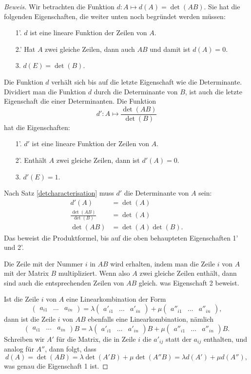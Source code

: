 \begin{proof}[Beweis]
Wir betrachten die Funktion $d\colon A\mapsto d(A) = \det(AB)$.
Sie hat die folgenden Eigenschaften, die weiter unten noch
begründet werden müssen:
\begin{enumerate}
\item[1'.] $d$ ist eine lineare Funktion der Zeilen von $A$.
\item[2.']
Hat $A$ zwei gleiche Zeilen, dann auch $AB$ und damit ist $d(A)=0$.
\item[3.]
$d(E)=\det(B)$.
\end{enumerate}
Die Funktion $d$ verhält sich bis auf die letzte Eigenschaft
wie die Determinante.
Dividiert man die Funktion $d$ durch die Determinante
von $B$, ist auch die letzte Eigenschaft die einer Determinanten.
Die Funktion
\[
d':A\mapsto \frac{\det(AB)}{\det(B)}
\]
hat die Eigenschaften:
\begin{enumerate}
\item[1'.] $d'$ ist eine lineare Funktion der Zeilen von $A$.
\item[2'.] Enthält $A$ zwei gleiche Zeilen, dann ist $d'(A)=0$.
\item[3.] $d'(E)=1$.
\end{enumerate}
Nach Satz \ref{detcharacterisation} muss $d'$ die Determinante von $A$ sein:
\begin{align*}
d'(A)&=\det(A)\\
\frac{\det(AB)}{\det(B)}&=\det(A)\\
\det(AB)&=\det(A)\det(B).
\end{align*}
Das beweist die Produktformel, bis auf die oben behaupteten Eigenschaften
1' und 2'.

Die Zeile mit der Nummer $i$ in $AB$ wird erhalten,
indem man die Zeile $i$ von $A$
mit der Matrix $B$ multipliziert.
Wenn also $A$ zwei gleiche Zeilen enthält, dann sind auch die
entsprechenden Zeilen von $AB$ gleich.
was Eigenschaft 2 beweist.

Ist die Zeile $i$ von $A$ eine Linearkombination der Form
\[
\begin{pmatrix}
a_{i1}&\dots&a_{in}
\end{pmatrix}
=
\lambda
\begin{pmatrix}
a'_{i1} &\dots &a'_{in}
\end{pmatrix}
+
\mu
\begin{pmatrix}
a''_{i1} &\dots &a''_{in}
\end{pmatrix},
\]
dann ist die Zeile $i$ von $AB$ ebenfalls eine Linearkombination,
nämlich
\[
\begin{pmatrix}
a_{i1}&\dots&a_{in}
\end{pmatrix}B
=
\lambda
\begin{pmatrix}
a'_{i1} &\dots &a'_{in}
\end{pmatrix}B
+
\mu
\begin{pmatrix}
a''_{i1} &\dots &a''_{in}
\end{pmatrix}B.
\]
Schreiben wir $A'$ für die Matrix, die in Zeile $i$ die $a'_{ij}$
statt der $a_{ij}$ enthalten, und analog für $A''$, dann folgt, dass
\[
d(A) = \det(AB)=\lambda \det(A'B)+\mu\det(A''B)=\lambda d(A') + \mu d(A''),
\]
was genau die Eigenschaft 1 ist.
\end{proof}

